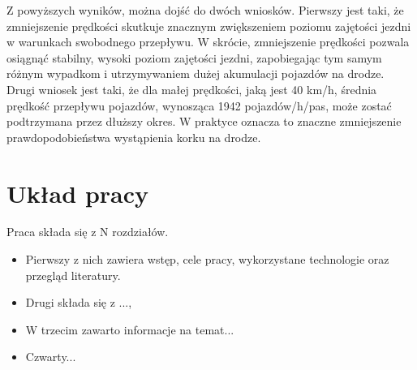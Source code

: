 Z powyższych wyników, można dojść do dwóch wniosków. Pierwszy jest taki, że zmniejszenie prędkości skutkuje znacznym zwiększeniem poziomu zajętości jezdni w warunkach swobodnego przepływu. W skrócie, zmniejszenie prędkości pozwala osiągnąć stabilny, wysoki poziom zajętości jezdni, zapobiegając tym samym różnym wypadkom i utrzymywaniem dużej akumulacji pojazdów na drodze. Drugi wniosek jest taki, że dla małej prędkości, jaką jest 40 km/h, średnia prędkość przepływu pojazdów, wynosząca 1942 pojazdów/h/pas, może zostać podtrzymana przez dłuższy okres. W praktyce oznacza to znaczne zmniejszenie prawdopodobieństwa wystąpienia korku na drodze.

\section{Układ pracy}
\label{sec:ukladPracy}

Praca składa się z N rozdziałów.

\begin{itemize}
\item Pierwszy z nich zawiera wstęp, cele pracy, wykorzystane technologie oraz przegląd literatury.
\item Drugi składa się z ...,
\item W trzecim zawarto informacje na temat...
\item Czwarty...
\end{itemize}

